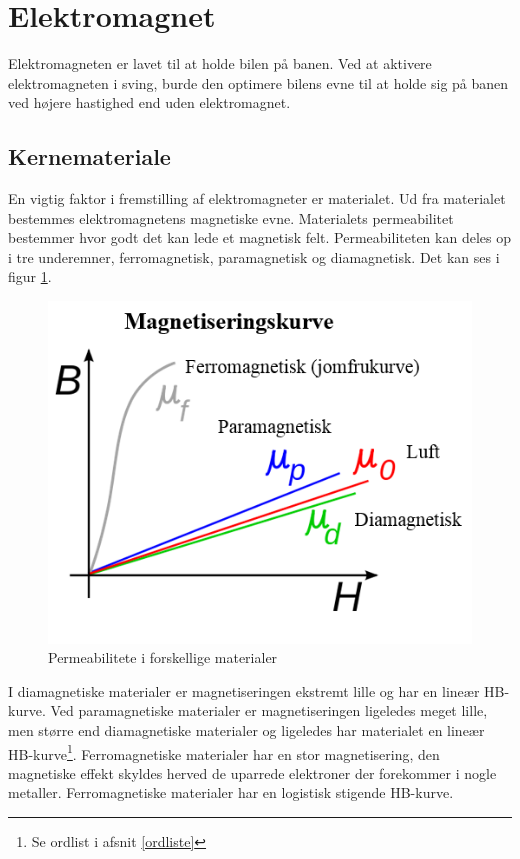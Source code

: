 \section{Elektromagnet}
Elektromagneten er lavet til at holde bilen på banen. Ved at aktivere elektromagneten i sving, burde den optimere bilens evne til at holde sig på banen ved højere hastighed end uden elektromagnet.

\subsection{Kernemateriale}
En vigtig faktor i fremstilling af elektromagneter er materialet. Ud fra materialet bestemmes elektromagnetens magnetiske evne. Materialets permeabilitet bestemmer hvor godt det kan lede et magnetisk felt. Permeabiliteten kan deles op i tre underemner, ferromagnetisk, paramagnetisk og diamagnetisk. Det kan ses i figur \ref{Permeabilitet}. \\
\begin{figure}
\includegraphics[scale=0.4]{./Graphics/Magnetiseringskurve}
\caption{Permeabilitete i forskellige materialer}
\label{Permeabilitet}
\end{figure}
I diamagnetiske materialer er magnetiseringen ekstremt lille og har en lineær HB-kurve. Ved paramagnetiske materialer er magnetiseringen ligeledes meget lille, men større end diamagnetiske materialer og ligeledes har materialet en lineær HB-kurve\footnote{Se ordlist i afsnit \ref{ordliste}}. Ferromagnetiske materialer har en stor magnetisering, den magnetiske effekt skyldes herved de uparrede elektroner der forekommer i nogle metaller. Ferromagnetiske materialer har en logistisk stigende HB-kurve.\\

